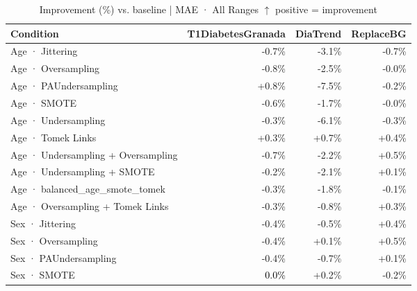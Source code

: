 \begin{table}[htbp]
\centering
\small
\caption{Improvement (\%) vs. baseline  |  MAE · All Ranges  $\uparrow$ positive = improvement}
\label{tab:delta_mae_entire}
\begin{tabular}{lrrr}
\toprule
\textbf{Condition} & \textbf{T1DiabetesGranada} & \textbf{DiaTrend} & \textbf{ReplaceBG} \\
\midrule
Age · Jittering & \textcolor{BrickRed}{-0.7\%} & \textcolor{BrickRed}{-3.1\%} & \textcolor{BrickRed}{-0.7\%} \\
Age · Oversampling & \textcolor{BrickRed}{-0.8\%} & \textcolor{BrickRed}{-2.5\%} & \textcolor{BrickRed}{-0.0\%} \\
Age · PAUndersampling & \textcolor{OliveGreen}{+0.8\%} & \textcolor{BrickRed}{-7.5\%} & \textcolor{BrickRed}{-0.2\%} \\
Age · SMOTE & \textcolor{BrickRed}{-0.6\%} & \textcolor{BrickRed}{-1.7\%} & \textcolor{BrickRed}{-0.0\%} \\
Age · Undersampling & \textcolor{BrickRed}{-0.3\%} & \textcolor{BrickRed}{-6.1\%} & \textcolor{BrickRed}{-0.3\%} \\
Age · Tomek Links & \textcolor{OliveGreen}{+0.3\%} & \textcolor{OliveGreen}{+0.7\%} & \textcolor{OliveGreen}{+0.4\%} \\
Age · Undersampling + Oversampling & \textcolor{BrickRed}{-0.7\%} & \textcolor{BrickRed}{-2.2\%} & \textcolor{OliveGreen}{+0.5\%} \\
Age · Undersampling + SMOTE & \textcolor{BrickRed}{-0.2\%} & \textcolor{BrickRed}{-2.1\%} & \textcolor{OliveGreen}{+0.1\%} \\
Age · balanced_age_smote_tomek & \textcolor{BrickRed}{-0.3\%} & \textcolor{BrickRed}{-1.8\%} & \textcolor{BrickRed}{-0.1\%} \\
Age · Oversampling + Tomek Links & \textcolor{BrickRed}{-0.3\%} & \textcolor{BrickRed}{-0.8\%} & \textcolor{OliveGreen}{+0.3\%} \\
\midrule
Sex · Jittering & \textcolor{BrickRed}{-0.4\%} & \textcolor{BrickRed}{-0.5\%} & \textcolor{OliveGreen}{+0.4\%} \\
Sex · Oversampling & \textcolor{BrickRed}{-0.4\%} & \textcolor{OliveGreen}{+0.1\%} & \textcolor{OliveGreen}{+0.5\%} \\
Sex · PAUndersampling & \textcolor{BrickRed}{-0.4\%} & \textcolor{BrickRed}{-0.7\%} & \textcolor{OliveGreen}{+0.1\%} \\
Sex · SMOTE & \textcolor{black}{0.0\%} & \textcolor{OliveGreen}{+0.2\%} & \textcolor{BrickRed}{-0.2\%} \\

\end{tabular}
\end{table}
